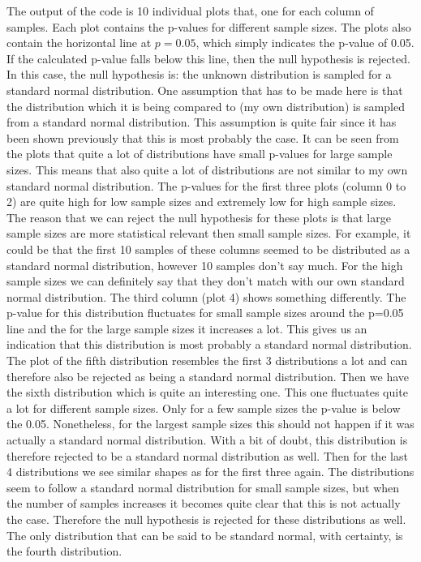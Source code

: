 
\vspace{-1em}
The output of the code is 10 individual plots that, one for each column of samples. Each plot contains the p-values for different sample sizes. The plots also contain the horizontal line at $p = 0.05$, which simply indicates the p-value of 0.05. If the calculated p-value falls below this line, then the null hypothesis is rejected. In this case, the null hypothesis is: the unknown distribution is sampled for a standard normal distribution. One assumption that has to be made here is that the distribution which it is being compared to (my own distribution) is sampled from a standard normal distribution. This assumption is quite fair since it has been shown previously that this is most probably the case.
It can be seen from the plots that quite a lot of distributions have small p-values for large sample sizes. This means that also quite a lot of distributions are not similar to my own standard normal distribution. The p-values for the first three plots (column 0 to 2) are quite high for low sample sizes and extremely low for high sample sizes. The reason that we can reject the null hypothesis for these plots is that large sample sizes are more statistical relevant then small sample sizes. For example, it could be that the first 10 samples of these columns seemed to be distributed as a standard normal distribution, however 10 samples don't say much. For the high sample sizes we can definitely say that they don't match with our own standard normal distribution. The third column  (plot 4) shows something differently. The p-value for this distribution fluctuates for small sample sizes around the p=0.05 line and the for the large sample sizes it increases a lot. This gives us an indication that this distribution is most probably a standard normal distribution. The plot of the fifth distribution resembles the first 3 distributions a lot and can therefore also be rejected as being a standard normal distribution. Then we have the sixth distribution which is quite an interesting one. This one fluctuates quite a lot for different sample sizes. Only for a few sample sizes the p-value is below the 0.05. Nonetheless, for the largest sample sizes this should not happen if it was actually a standard normal distribution. With a bit of doubt, this distribution is therefore rejected to be a standard normal distribution as well. Then for the last 4 distributions we see similar shapes as for the first three again. The distributions seem to follow a standard normal distribution for small sample sizes, but when the number of samples increases it becomes quite clear that this is not actually the case. Therefore the null hypothesis is rejected for these distributions as well. The only distribution that can be said to be standard normal, with certainty, is the fourth distribution.

